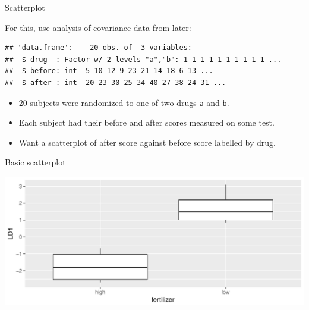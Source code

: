 \begin{frame}[fragile]{Scatterplot}
  
For this, use analysis of covariance data from later:

\begin{knitrout}
\color{fgcolor}\begin{kframe}
\begin{alltt}
\hlkwb{=}\hlstd{(}\hlstd{,}
\end{alltt}
\begin{verbatim}
## 'data.frame':	20 obs. of  3 variables:
##  $ drug  : Factor w/ 2 levels "a","b": 1 1 1 1 1 1 1 1 1 1 ...
##  $ before: int  5 10 12 9 23 21 14 18 6 13 ...
##  $ after : int  20 23 30 25 34 40 27 38 24 31 ...
\end{verbatim}
\end{kframe}
\end{knitrout}

\begin{itemize}
\item 
20 subjects were randomized to one of two drugs \texttt{a} and
\texttt{b}.
\item Each subject had their before and after scores measured on
some test.
\item Want a scatterplot of after score against before score
labelled by drug.
\end{itemize}
  
\end{frame}

\begin{frame}[fragile]{Basic scatterplot}
  
\begin{knitrout}
\color{fgcolor}\begin{kframe}
\begin{alltt}
\hlstd{(}\hlopt{+}\hlstd{()}
\end{alltt}
\end{kframe}
\includegraphics[width=\maxwidth]{figure/unnamed-chunk-8-1} 

\end{knitrout}
  
\end{frame}

